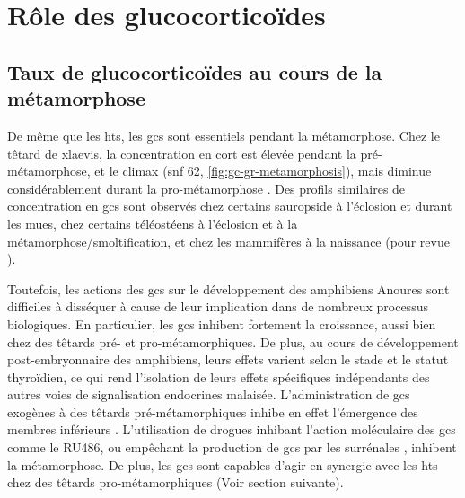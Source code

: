 \documentclass[../main.tex]{subfiles}
\begin{document}


\section{Rôle des glucocorticoïdes}

	\subsection{Taux de glucocorticoïdes au cours de la métamorphose}

		De même que les \glspl{ht}, les \glspl{gc} sont essentiels pendant la métamorphose.
		Chez le têtard de \gls{xlaevis}, la concentration en \gls{cort} est élevée pendant la pré-métamorphose, et le climax (\gls{snf} 62, \autoref{fig:gc-gr-metamorphosis}), mais diminue considérablement durant la pro-métamorphose \citep{JolivetJaudet1984,Kloas1997}.
		Des profils similaires de concentration en \glspl{gc} sont observés chez certains sauropside à l'éclosion et durant les mues, chez certains téléostéens à l'éclosion et à la métamorphose/smoltification, et chez les mammifères à la naissance (pour revue \citealp{Wada2008}).

		

		Toutefois, les actions des \glspl{gc} sur le développement des amphibiens Anoures sont difficiles à disséquer à cause de leur implication dans de nombreux processus biologiques.
		En particulier, les \glspl{gc} inhibent fortement la croissance, aussi bien chez des têtards pré- et pro-métamorphiques.
		De plus, au cours de développement post-embryonnaire des amphibiens, leurs effets varient selon le stade et le statut thyroïdien, ce qui rend l'isolation de leurs effets spécifiques indépendants des autres voies de signalisation endocrines malaisée.
		L'administration de \glspl{gc} exogènes à des têtards pré-métamorphiques inhibe en effet l'émergence des membres inférieurs \citep{Kobayashi1958}.
		L'utilisation de drogues inhibant l'action moléculaire des \glspl{gc} comme le RU486, ou empêchant la production de \glspl{gc} par les surrénales \citep{Kikuyama1982}, inhibent la métamorphose.
		De plus, les \glspl{gc} sont capables d'agir en synergie avec les \glspl{ht} chez des têtards pro-métamorphiques \citep{Hayes1993a,Hayes1994,Gray1990} (Voir section suivante).
\end{document}
